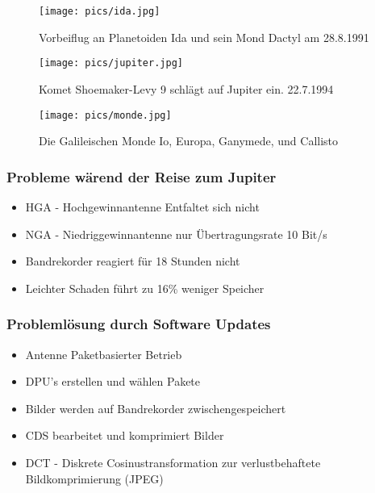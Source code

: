 \begin{frame}
	\begin{figure}
		\centering
		\texttt{[image: pics/ida.jpg]}
		\caption{Vorbeiflug an Planetoiden Ida und sein Mond Dactyl am 28.8.1991\cite{nasaphoto}}
		\label{IDA}
	\end{figure}
\end{frame}

\begin{frame}
	\begin{figure}
		\centering
		\texttt{[image: pics/jupiter.jpg]}
		\caption{Komet Shoemaker-Levy 9 schl\"agt auf Jupiter ein. 22.7.1994\cite{nasaphoto}}
		\label{JUPITER}
	\end{figure}
\end{frame}

\begin{frame}
	\begin{figure}
		\centering
		\texttt{[image: pics/monde.jpg]}
		\caption{Die Galileischen Monde Io, Europa, Ganymede, und Callisto\cite{nasaphoto}}
		\label{GALILEO_MONDE}
	\end{figure}
\end{frame}

\begin{frame}
	\frametitle{Probleme wärend der Reise zum Jupiter}
	\begin{itemize}
		\item HGA - Hochgewinnantenne Entfaltet sich nicht
		\item NGA - Niedriggewinnantenne nur \"Ubertragungsrate 10 Bit/s
		
		\item Bandrekorder reagiert für 18 Stunden nicht
		\item Leichter Schaden f\"uhrt zu 16\% weniger Speicher
	\end{itemize}
\end{frame}

\begin{frame}
	\frametitle{Probleml\"osung durch Software Updates}
	\begin{itemize}
		\item Antenne Paketbasierter Betrieb
		\item DPU's erstellen und w\"ahlen Pakete
		\item Bilder werden auf Bandrekorder zwischengespeichert
		\item CDS bearbeitet und komprimiert Bilder
		\item DCT - Diskrete Cosinustransformation zur verlustbehaftete Bildkomprimierung (JPEG)
	\end{itemize}
\end{frame}

